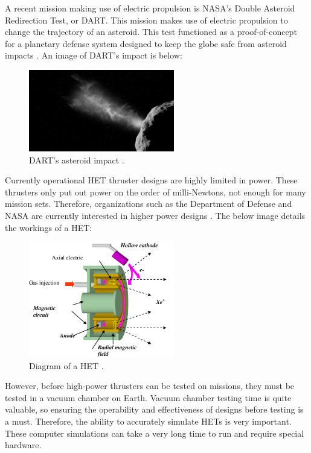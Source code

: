 \documentclass[letterpaper, 10 pt, conference]{ieeeconf}  %
\begin{document}
A recent mission making use of electric propulsion is NASA’s Double Asteroid Redirection Test, or DART. This mission makes use of electric propulsion to change the trajectory of an asteroid. This test functioned as a proof-of-concept for a planetary defense system designed to keep the globe safe from asteroid impacts \cite{c7}. An image of DART’s impact is below:

\begin{figure}[H]
      \centering
      \includegraphics[width=2.5in]{Images/DART.jpg}
      \caption{DART's asteroid impact \cite{c6}.}
      \label{fig:2}
\end{figure}

Currently operational HET thruster designs are highly limited in power. These thrusters only put out power on the order of milli-Newtons, not enough for many mission sets. Therefore, organizations such as the Department of Defense and NASA are currently interested in higher power designs \cite{c3}.  The below image details the workings of a HET:

\begin{figure}[H]
      \centering
      \includegraphics[width=2.5in]{Images/het_dia.png}
      \caption{Diagram of a HET \cite{c6}.}
      \label{fig:1}
\end{figure}

However, before high-power thrusters can be tested on missions, they must be tested in a vacuum chamber on Earth. Vacuum chamber testing time is quite valuable, so ensuring the operability and effectiveness of designs before testing is a must. Therefore, the ability to accurately simulate HETs is very important. These computer simulations can take a very long time to run and require special hardware. 
\end{document}
